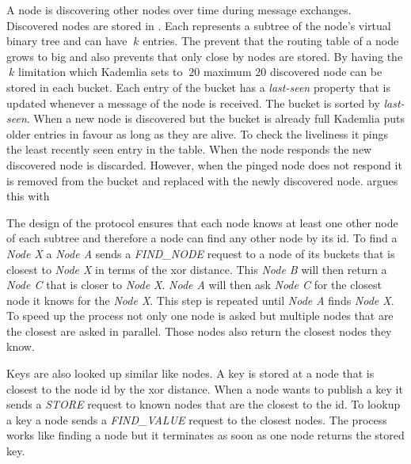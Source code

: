 A node is discovering other nodes over time during message exchanges. Discovered nodes are stored in . Each  represents a subtree of the node's virtual binary tree and can have $\ k $ entries. The  prevent that the routing table of a node grows to big and also prevents that only close by nodes are stored. By having the $\ k $ limitation which Kademlia sets to $\ 20 $ maximum 20 discovered node can be stored in each bucket. 
Each entry of the bucket has a \textit{last-seen} property that is updated whenever a message of the node is received. The bucket is sorted by \textit{last-seen}. When a new node is discovered but the bucket is already full Kademlia puts older entries in favour as long as they are alive. To check the liveliness it pings the least recently seen entry in the table. When the node responds the new discovered node is discarded. However, when the pinged node does not respond it is removed from the bucket and replaced with the newly discovered node. \citet[\S2.2]{kademlia} argues this with 

The design of the protocol ensures that each node knows at least one other node of each subtree and therefore a node can find any other node by its id. To find a \textit{Node X} a \textit{Node A} sends a \textit{FIND\_NODE} request to a node of its buckets that is closest to \textit{Node X} in terms of the \gls{xor} distance. This \textit{Node B} will then return a \textit{Node C} that is closer to \textit{Node X}. \textit{Node A} will then ask \textit{Node C} for the closest node it knows for the \textit{Node X}. This step is repeated until \textit{Node A} finds \textit{Node X}. To speed up the process not only one node is asked but multiple nodes that are the closest are asked in parallel. Those nodes also return the closest nodes they know.

Keys are also looked up similar like nodes. A key is stored at a node that is closest to the node id by the \gls{xor} distance. When a node wants to publish a key it sends a \textit{STORE} request to known nodes that are the closest to the id.
To lookup a key a node sends a \textit{FIND\_VALUE} request to the closest nodes. The process works like finding a node but it terminates as soon as one node returns the stored key.

